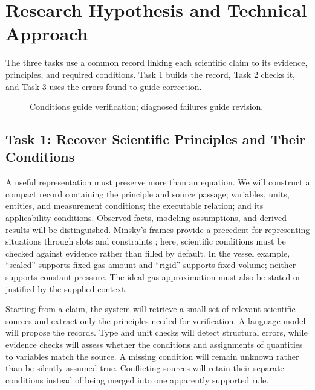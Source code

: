 \documentclass[12pt]{article}
\begin{document}
\section*{Research Hypothesis and Technical Approach}

The three tasks use a common record linking each scientific claim to its evidence, principles, and required conditions. Task 1 builds the record, Task 2 checks it, and Task 3 uses the errors found to guide correction.

\begin{figure}[ht]
\centering
{}
\vspace{2mm}
\caption{Conditions guide verification; diagnosed failures guide revision.}
\end{figure}

\subsection*{Task 1: Recover Scientific Principles and Their Conditions}

A useful representation must preserve more than an equation. We will construct a compact record containing the principle and source passage; variables, units, entities, and measurement conditions; the executable relation; and its applicability conditions. Observed facts, modeling assumptions, and derived results will be distinguished. Minsky's frames provide a precedent for representing situations through slots and constraints \citep{minsky1974frames}; here, scientific conditions must be checked against evidence rather than filled by default. In the vessel example, ``sealed'' supports fixed gas amount and ``rigid'' supports fixed volume; neither supports constant pressure. The ideal-gas approximation must also be stated or justified by the supplied context.

Starting from a claim, the system will retrieve a small set of relevant scientific sources and extract only the principles needed for verification. A language model will propose the records. Type and unit checks will detect structural errors, while evidence checks will assess whether the conditions and assignments of quantities to variables match the source. A missing condition will remain unknown rather than be silently assumed true. Conflicting sources will retain their separate conditions instead of being merged into one apparently supported rule.
\end{document}
